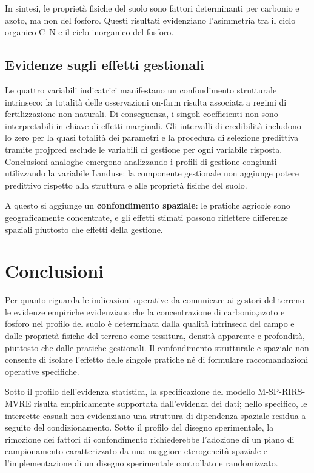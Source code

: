 \documentclass[11pt, a4paper]{article}
\begin{document}
In sintesi, le proprietà fisiche del suolo sono fattori determinanti per carbonio e azoto, ma non del fosforo. Questi risultati evidenziano l'asimmetria tra il ciclo organico C--N e il ciclo inorganico del fosforo.




\subsection{Evidenze sugli effetti gestionali}

Le quattro variabili indicatrici manifestano un confondimento strutturale intrinseco: la totalità delle osservazioni on-farm risulta associata a regimi di fertilizzazione non naturali. Di conseguenza, i singoli coefficienti non sono interpretabili in chiave di effetti marginali. Gli intervalli di credibilità includono lo zero per la quasi totalità dei parametri e la procedura di selezione predittiva tramite projpred esclude le variabili di gestione per ogni variabile risposta. Conclusioni analoghe emergono analizzando i profili di gestione congiunti utilizzando la variabile Landuse: la componente gestionale non aggiunge potere predittivo rispetto alla struttura e alle proprietà fisiche del suolo. 

A questo si aggiunge un \textbf{confondimento spaziale}: le pratiche agricole sono geograficamente concentrate, e gli effetti stimati possono riflettere differenze spaziali piuttosto che effetti della gestione.

\section{Conclusioni}

Per quanto riguarda le indicazioni operative da comunicare ai gestori del terreno le evidenze empiriche evidenziano che la concentrazione di carbonio,azoto e fosforo nel profilo del suolo è determinata dalla qualità intrinseca del campo e dalle proprietà fisiche del terreno come tessitura, densità apparente e profondità, piuttosto che dalle pratiche gestionali. Il confondimento strutturale e spaziale non consente di isolare l'effetto delle singole pratiche né di formulare raccomandazioni operative specifiche.

Sotto il profilo dell'evidenza statistica, la specificazione del modello M-SP-RIRS-MVRE risulta empiricamente supportata dall'evidenza dei dati; nello specifico, le intercette casuali non evidenziano una struttura di dipendenza spaziale residua a seguito del condizionamento. Sotto il profilo del disegno sperimentale, la rimozione dei fattori di confondimento richiederebbe l'adozione di un piano di campionamento caratterizzato da una maggiore eterogeneità spaziale e l'implementazione di un disegno sperimentale controllato e randomizzato.
\end{document}
